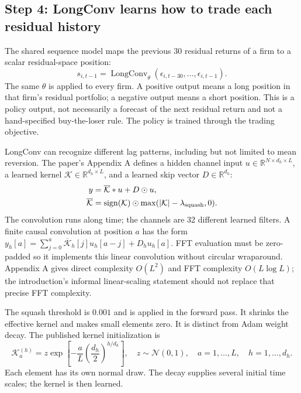 \documentclass[11pt]{article}
\begin{document}
\subsection{Step 4: LongConv learns how to trade each residual history}
\label{sec:longconv}

The shared sequence model maps the previous 30 residual returns of a
firm to a scalar residual-space position:
\begin{equation}
 s_{i,t-1}=\operatorname{LongConv}_\theta
 (\epsilon_{i,t-30},\ldots,\epsilon_{i,t-1}).
 \label{eq:signals}
\end{equation}
The same $\theta$ is applied to every firm. A positive output means a
long position in that firm's residual portfolio; a negative output
means a short position. This is a policy output, not necessarily a
forecast of the next residual return and not a hand-specified
buy-the-loser rule. The policy is trained through the trading objective.

LongConv can recognize different lag patterns, including but not
limited to mean reversion. The paper's Appendix A defines a hidden
channel input $u\in\mathbb R^{N\times d_h\times L}$, a learned kernel
$\mathcal K\in\mathbb R^{d_h\times L}$, and a learned skip vector
$D\in\mathbb R^{d_h}$:
\begin{align}
 y&=\overline{\mathcal K}*u+D\odot u,
 \label{eq:longconv}\\
 \overline{\mathcal K}
 &=\operatorname{sign}(\mathcal K)\odot
 \max(|\mathcal K|-\lambda_{\rm squash},0).
 \label{eq:squash}
\end{align}
The convolution runs along time; the channels are 32 different learned
filters. A finite causal convolution at position $a$ has the form
$y_h[a]=\sum_{j=0}^a\overline{\mathcal K}_h[j]u_h[a-j]+D_hu_h[a]$.
FFT evaluation must be zero-padded so it implements this linear
convolution without circular wraparound. Appendix A gives direct
complexity $O(L^2)$ and FFT complexity $O(L\log L)$; the introduction's
informal linear-scaling statement should not replace that precise
FFT complexity.

The squash threshold is $0.001$ and is applied in the forward pass.
It shrinks the effective kernel and makes small elements zero. It is
distinct from Adam weight decay. The published kernel initialization is
\begin{equation}
 \mathcal K^{(h)}_a
 =z\exp\left[-\frac{a}{L}
 \left(\frac{d_h}{2}\right)^{h/d_h}\right],
 \quad z\sim\mathcal N(0,1),\quad a=1,\ldots,L,
 \quad h=1,\ldots,d_h.
 \label{eq:kernel-init}
\end{equation}
Each element has its own normal draw. The decay supplies several
initial time scales; the kernel is then learned.
\end{document}
